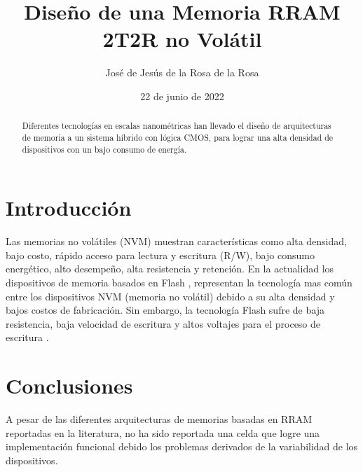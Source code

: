 \documentclass[reprint,amsmath,amssymb,aps]{revtex4-2}
\begin{document}

\title{Diseño de una Memoria RRAM 2T2R no Volátil}
\author{José de Jesús de la Rosa de la Rosa}
\date{22 de junio de 2022}

\begin{abstract}
Diferentes tecnologías en escalas nanométricas han llevado el diseño de arquitecturas de memoria a un sistema híbrido con lógica CMOS, para lograr una alta densidad de dispositivos con un bajo consumo de energía.
\end{abstract}


\maketitle 

\section{Introducción}
Las memorias no volátiles (NVM) muestran características como alta densidad, bajo costo, rápido acceso para lectura y escritura (R/W), bajo consumo energético, alto desempeño, alta resistencia y retención. En la actualidad los dispositivos de memoria basados en Flash \cite{manem, maju}, representan la tecnología mas común entre los dispositivos NVM (memoria no volátil) debido a su alta densidad y bajos costos de fabricación. Sin embargo, la tecnología Flash sufre de baja resistencia, baja velocidad de escritura y altos voltajes para el proceso de escritura \cite{wang}. 



\section{Conclusiones}
A pesar de las diferentes arquitecturas de memorias basadas en RRAM reportadas en la literatura, no ha sido reportada una celda que logre una implementación funcional debido los problemas derivados de la variabilidad de los dispositivos.
  

\nocite{*}
\end{document}
